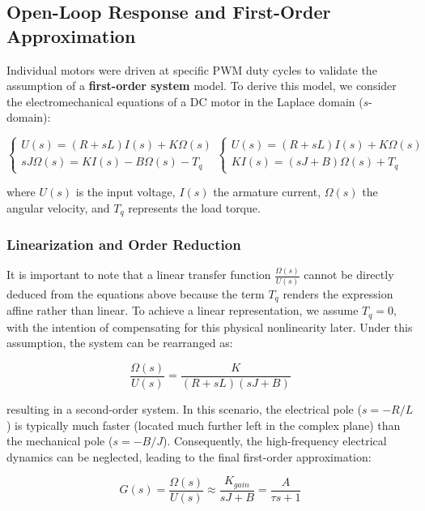 \subsection{Open-Loop Response and First-Order Approximation}
Individual motors were driven at specific PWM duty cycles to validate the assumption of a \textbf{first-order system} model. To derive this model, we consider the electromechanical equations of a DC motor in the Laplace domain ($s$-domain):

\begin{equation}
\begin{cases}
    U(s) = (R + sL)I(s) + K\Omega(s) \\
    sJ\Omega(s) = KI(s) - B\Omega(s) - T_q
\end{cases}
\begin{cases}
    U(s) = (R + sL)I(s) + K\Omega(s) \\
    KI(s) = (sJ + B)\Omega(s) + T_q
\end{cases}
\end{equation}

where $U(s)$ is the input voltage, $I(s)$ the armature current, $\Omega(s)$ the angular velocity, and $T_q$ represents the load torque. 

\subsubsection{Linearization and Order Reduction}
It is important to note that a linear transfer function $\frac{\Omega(s)}{U(s)}$ cannot be directly deduced from the equations above because the term $T_q$ renders the expression affine rather than linear. To achieve a linear representation, we assume $T_q = 0$, with the intention of compensating for this physical nonlinearity later. Under this assumption, the system can be rearranged as:

\begin{equation}
    \frac{\Omega(s)}{U(s)} = \frac{K}{(R + sL)(sJ + B)}
\end{equation}

resulting in a second-order system. In this scenario, the electrical pole ($s = -R/L$) is typically much faster (located much further left in the complex plane) than the mechanical pole ($s = -B/J$). Consequently, the high-frequency electrical dynamics can be neglected, leading to the final first-order approximation:

\begin{equation}
    G(s) = \frac{\Omega(s)}{U(s)} \approx \frac{K_{gain}}{sJ + B} = \frac{A}{\tau s + 1}
\end{equation}


